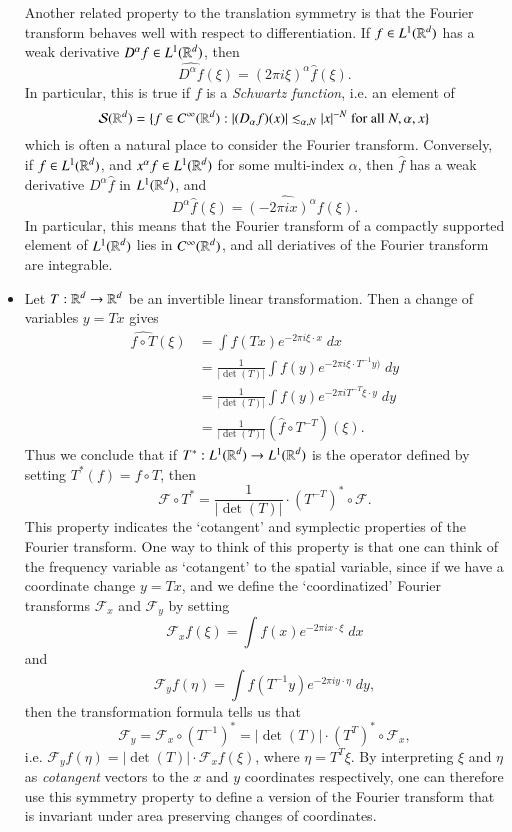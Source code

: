 \begin{itemize}
    Another related property to the translation symmetry is that the Fourier transform behaves well with respect to differentiation. If $f \in L^1(\operatorname{\mathbb{R}}^d)$ has a weak derivative $D^\alpha f \in L^1(\operatorname{\mathbb{R}}^d)$, then
    \[ \widehat{D^\alpha f}(\xi) = (2 \pi i \xi)^\alpha \widehat{f}(\xi). \]
    In particular, this is true if $f$ is a \emph{Schwartz function}, i.e. an element of
    \[ \mathcal{S}(\operatorname{\mathbb{R}}^d) = \{ f \in C^\infty(\operatorname{\mathbb{R}}^d): |(D_\alpha f)(x)| \lesssim_{\alpha,N} |x|^{-N}\ \text{for all $N, \alpha, x$} \} \]
    which is often a natural place to consider the Fourier transform. Conversely, if $f \in L^1(\operatorname{\mathbb{R}}^d)$, and $x^\alpha f \in L^1(\operatorname{\mathbb{R}}^d)$ for some multi-index $\alpha$, then $\widehat{f}$ has a weak derivative $D^\alpha \widehat{f}$ in $L^1(\operatorname{\mathbb{R}}^d)$, and
    \[ D^\alpha \widehat{f}(\xi) = \widehat{(-2 \pi i x)^\alpha f}(\xi). \]
    In particular, this means that the Fourier transform of a compactly supported element of $L^1(\operatorname{\mathbb{R}}^d)$ lies in $C^\infty(\operatorname{\mathbb{R}}^d)$, and all deriatives of the Fourier transform are integrable.

    \item Let $T: \operatorname{\mathbb{R}}^d \to \operatorname{\mathbb{R}}^d$ be an invertible linear transformation. Then a change of variables $y = Tx$ gives
    \begin{align*}
        \widehat{f \circ T}(\xi) &= \int f(Tx) e^{-2 \pi i \xi \cdot x}\; dx\\
        &= \frac{1}{|\det(T)|} \int f(y) e^{-2 \pi i \xi \cdot T^{-1}y)}\; dy\\
        &= \frac{1}{|\det(T)|} \int f(y) e^{- 2 \pi i T^{-T} \xi \cdot y}\; dy\\
        &= \frac{1}{|\det(T)|} (\widehat{f} \circ T^{-T})(\xi).
    \end{align*}
    Thus we conclude that if $T^*: L^1(\operatorname{\mathbb{R}}^d) \to L^1(\operatorname{\mathbb{R}}^d)$ is the operator defined by setting $T^*(f) = f \circ T$, then 
    \[ \mathcal{F} \circ T^* = \frac{1}{|\det(T)|} \cdot (T^{-T})^* \circ \mathcal{F}. \]
    This property indicates the `cotangent' and symplectic properties of the Fourier transform. One way to think of this property is that one can think of the frequency variable as `cotangent' to the spatial variable, since if we have a coordinate change $y = Tx$, and we define the `coordinatized' Fourier transforms $\mathcal{F}_x$ and $\mathcal{F}_y$ by setting
    \[ \mathcal{F}_x f(\xi) = \int f(x) e^{-2 \pi i x \cdot \xi}\; dx \]
    and
    \[ \mathcal{F}_y f(\eta) = \int f(T^{-1}y) e^{-2 \pi i y \cdot \eta}\; dy, \]
    then the transformation formula tells us that
    \[ \mathcal{F}_y = \mathcal{F}_x \circ (T^{-1})^* = |\det(T)| \cdot (T^T)^* \circ \mathcal{F}_x, \]
    i.e. $\mathcal{F}_y f(\eta) = |\det(T)| \cdot \mathcal{F}_x f(\xi)$, where $\eta = T^T \xi$. By interpreting $\xi$ and $\eta$ as \emph{cotangent} vectors to the $x$ and $y$ coordinates respectively, one can therefore use this symmetry property to define a version of the Fourier transform that is invariant under area preserving changes of coordinates.


\end{itemize}
